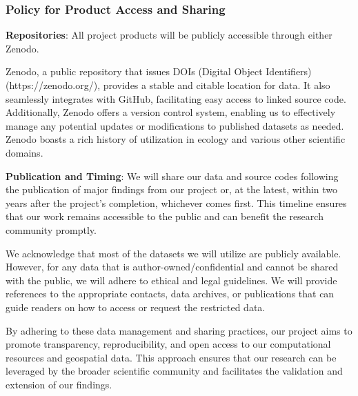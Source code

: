 \documentclass[12pt, class=article, crop=false]{standalone}
\begin{document}
\subsubsection*{Policy for Product Access and Sharing}

\textbf{Repositories}: All project products will be publicly accessible through either Zenodo.

Zenodo, a public repository that issues DOIs (Digital Object Identifiers) (https://zenodo.org/), provides a stable and citable location for data.
It also seamlessly integrates with GitHub, facilitating easy access to linked source code.
Additionally, Zenodo offers a version control system, enabling us to effectively manage any potential updates or modifications to published datasets as needed. Zenodo boasts a rich history of utilization in ecology and various other scientific domains.

\textbf{Publication and Timing}: We will share our data and source codes following the publication of major findings from our project or, at the latest, within two years after the project's completion, whichever comes first.
This timeline ensures that our work remains accessible to the public and can benefit the research community promptly.

We acknowledge that most of the datasets we will utilize are publicly available.
However, for any data that is author-owned/confidential and cannot be shared with the public, we will adhere to ethical and legal guidelines.
We will provide references to the appropriate contacts, data archives, or publications that can guide readers on how to access or request the restricted data.

By adhering to these data management and sharing practices, our project aims to promote transparency, reproducibility, and open access to our computational resources and geospatial data.
This approach ensures that our research can be leveraged by the broader scientific community and facilitates the validation and extension of our findings.
\end{document}
